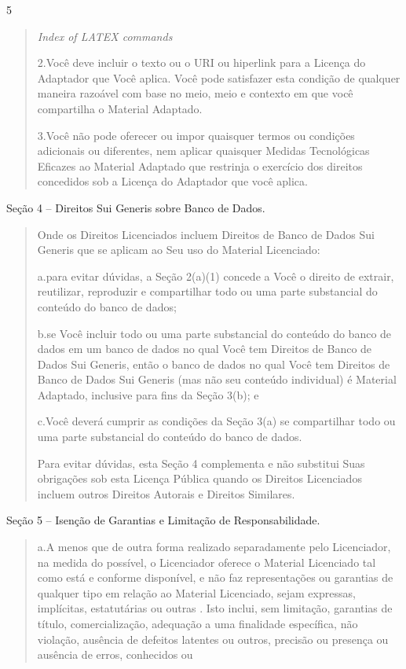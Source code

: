 \documentclass[
]{article}
\begin{document}
5

\begin{quote}
\emph{Index of LATEX commands}

2.Você deve incluir o texto ou o URI ou hiperlink para a Licença do
Adaptador que Você aplica. Você pode satisfazer esta condição de
qualquer maneira razoável com base no meio, meio e contexto em que você
compartilha o Material Adaptado.

3.Você não pode oferecer ou impor quaisquer termos ou condições
adicionais ou diferentes, nem aplicar quaisquer Medidas Tecnológicas
Eficazes ao Material Adaptado que restrinja o exercício dos direitos
concedidos sob a Licença do Adaptador que você aplica.
\end{quote}

Seção 4 -- Direitos Sui Generis sobre Banco de Dados.

\begin{quote}
Onde os Direitos Licenciados incluem Direitos de Banco de Dados Sui
Generis que se aplicam ao Seu uso do Material Licenciado:

a.para evitar dúvidas, a Seção 2(a)(1) concede a Você o direito de
extrair, reutilizar, reproduzir e compartilhar todo ou uma parte
substancial do conteúdo do banco de dados;

b.se Você incluir todo ou uma parte substancial do conteúdo do banco de
dados em um banco de dados no qual Você tem Direitos de Banco de Dados
Sui Generis, então o banco de dados no qual Você tem Direitos de Banco
de Dados Sui Generis (mas não seu conteúdo individual) é Material
Adaptado, inclusive para fins da Seção 3(b); e

c.Você deverá cumprir as condições da Seção 3(a) se compartilhar todo ou
uma parte substancial do conteúdo do banco de dados.

Para evitar dúvidas, esta Seção 4 complementa e não substitui Suas
obrigações sob esta Licença Pública quando os Direitos Licenciados
incluem outros Direitos Autorais e Direitos Similares.
\end{quote}

Seção 5 -- Isenção de Garantias e Limitação de Responsabilidade.

\begin{quote}
a.A menos que de outra forma realizado separadamente pelo Licenciador,
na medida do possível, o Licenciador oferece o Material Licenciado tal
como está e conforme disponível, e não faz representações ou garantias
de qualquer tipo em relação ao Material Licenciado, sejam expressas,
implícitas, estatutárias ou outras . Isto inclui, sem limitação,
garantias de título, comercialização, adequação a uma finalidade
específica, não violação, ausência de defeitos latentes ou outros,
precisão ou presença ou ausência de erros, conhecidos ou
\end{quote}
\end{document}
